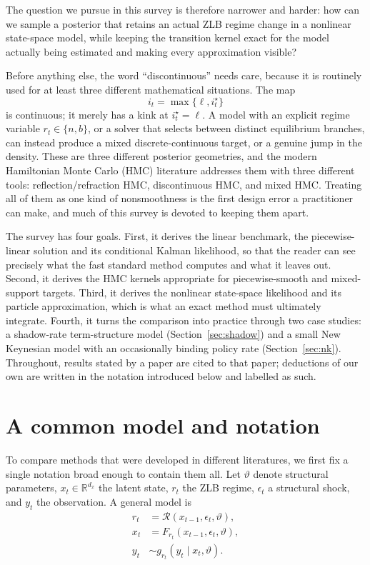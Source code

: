 \documentclass[11pt]{article}
\begin{document}
The question we pursue in this survey is therefore narrower and harder: how
can we sample a posterior that retains an actual ZLB regime change in a
nonlinear state-space model, while keeping the transition kernel exact for the
model actually being estimated and making every approximation visible?

Before anything else, the word ``discontinuous'' needs care, because it is
routinely used for at least three different mathematical situations. The map
\[
 i_t=\max\{\ell,i_t^\star\}
\]
is continuous; it merely has a kink at \(i_t^\star=\ell\). A model with an
explicit regime variable \(r_t\in\{n,b\}\), or a solver that selects between
distinct equilibrium branches, can instead produce a mixed
discrete-continuous target, or a genuine jump in the density. These are three
different posterior geometries, and the modern Hamiltonian Monte Carlo (HMC)
literature addresses them with three different tools:
reflection/refraction HMC, discontinuous HMC, and mixed HMC. Treating all of
them as one kind of nonsmoothness is the first design error a practitioner
can make, and much of this survey is devoted to keeping them apart.

The survey has four goals. First, it derives the linear benchmark, the
piecewise-linear solution and its conditional Kalman likelihood, so that
the reader can see precisely what the fast standard method computes and what
it leaves out. Second, it derives the HMC kernels appropriate for
piecewise-smooth and mixed-support targets. Third, it derives the nonlinear
state-space likelihood and its particle approximation, which is what an exact
method must ultimately integrate. Fourth, it turns the comparison into
practice through two case studies: a shadow-rate term-structure model
(Section~\ref{sec:shadow}) and a small New Keynesian model with an
occasionally binding policy rate (Section~\ref{sec:nk}). Throughout, results
stated by a paper are cited to that paper; deductions of our own are written
in the notation introduced below and labelled as such.

\section{A common model and notation}\label{sec:model}

To compare methods that were developed in different literatures, we first fix
a single notation broad enough to contain them all. Let \(\vartheta\) denote
structural parameters, \(x_t\in\mathbb R^{d_x}\) the latent state, \(r_t\)
the ZLB regime, \(\epsilon_t\) a structural shock, and \(y_t\) the
observation. A general model is
\begin{equation}\label{eq:1}
\begin{aligned}
 r_t &= \mathcal R(x_{t-1},\epsilon_t,\vartheta),\\
 x_t &= F_{r_t}(x_{t-1},\epsilon_t,\vartheta),\\
 y_t &\sim g_{r_t}(y_t\mid x_t,\vartheta).
\end{aligned}
\end{equation}
\end{document}
